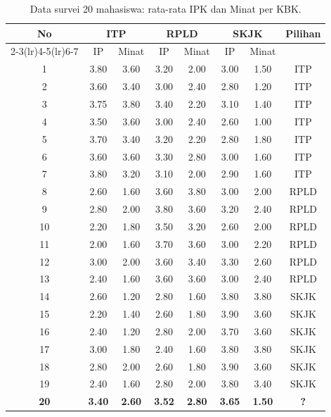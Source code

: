 \documentclass[conference]{IEEEtran}
\begin{document}
\begin{table}[htbp]
\centering\caption{Data survei 20 mahasiswa: rata-rata IPK dan Minat per KBK.}
\label{tab:data}
\small
\begin{tabular}{@{}c cc cc cc c@{}}
\toprule
\multirow{2}{*}{No} & \multicolumn{2}{c}{ITP} & \multicolumn{2}{c}{RPLD}
  & \multicolumn{2}{c}{SKJK} & \multirow{2}{*}{Pilihan} \\
\cmidrule(lr){2-3}\cmidrule(lr){4-5}\cmidrule(lr){6-7}
  & IP & Minat & IP & Minat & IP & Minat & \\
\midrule
1  & 3.80 & 3.60 & 3.20 & 2.00 & 3.00 & 1.50 & ITP  \\
2  & 3.60 & 3.40 & 3.00 & 2.40 & 2.80 & 1.20 & ITP  \\
3  & 3.75 & 3.80 & 3.40 & 2.20 & 3.10 & 1.40 & ITP  \\
4  & 3.50 & 3.60 & 3.00 & 2.40 & 2.60 & 1.00 & ITP  \\
5  & 3.70 & 3.40 & 3.20 & 2.20 & 2.80 & 1.80 & ITP  \\
6  & 3.60 & 3.60 & 3.30 & 2.80 & 3.00 & 1.60 & ITP  \\
7  & 3.80 & 3.20 & 3.10 & 2.00 & 2.90 & 1.60 & ITP  \\
\midrule
8  & 2.60 & 1.60 & 3.60 & 3.80 & 3.00 & 2.00 & RPLD \\
9  & 2.80 & 2.00 & 3.80 & 3.60 & 3.20 & 2.40 & RPLD \\
10 & 2.20 & 1.80 & 3.50 & 3.20 & 2.60 & 2.00 & RPLD \\
11 & 2.00 & 1.60 & 3.70 & 3.60 & 3.00 & 2.20 & RPLD \\
12 & 3.00 & 2.00 & 3.60 & 3.40 & 3.30 & 2.60 & RPLD \\
13 & 2.40 & 1.60 & 3.60 & 3.60 & 3.00 & 2.40 & RPLD \\
\midrule
14 & 2.60 & 1.20 & 2.80 & 1.60 & 3.80 & 3.80 & SKJK \\
15 & 2.20 & 1.40 & 2.60 & 1.80 & 3.90 & 3.60 & SKJK \\
16 & 2.40 & 1.20 & 2.80 & 2.00 & 3.70 & 3.60 & SKJK \\
17 & 3.00 & 1.80 & 2.40 & 1.60 & 3.80 & 3.80 & SKJK \\
18 & 2.80 & 2.00 & 2.60 & 1.80 & 3.90 & 3.60 & SKJK \\
19 & 2.40 & 1.60 & 2.80 & 2.00 & 3.80 & 3.40 & SKJK \\
\midrule
\textbf{20} & \textbf{3.40} & \textbf{2.60}
  & \textbf{3.52} & \textbf{2.80}
  & \textbf{3.65} & \textbf{1.50} & \textbf{?} \\
\bottomrule
\end{tabular}
\end{table}
\end{document}
